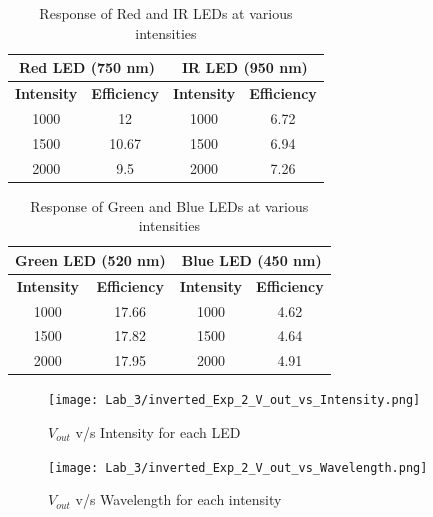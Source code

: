 \documentclass[a4paper]{article}
\begin{document}
\newpage
\begin{table}[h!]
\centering
\begin{tabular}{|c|c|c|c|}
\hline
\multicolumn{2}{|c|}{\textbf{Red LED (750 nm)}} & \multicolumn{2}{c|}{\textbf{IR LED (950 nm)}} \\ \hline
\textbf{Intensity} & \textbf{Efficiency} & \textbf{Intensity} & \textbf{Efficiency} \\ \hline
1000 & 12 & 1000 & 6.72 \\ \hline
1500 & 10.67 & 1500 & 6.94 \\ \hline
2000 & 9.5 & 2000 & 7.26 \\ \hline
\end{tabular}
\caption{Response of Red and IR LEDs at various intensities}
\label{tab:red_ir_led}
\end{table}

\vspace{1em}

\begin{table}[h!]
\centering
\begin{tabular}{|c|c|c|c|}
\hline
\multicolumn{2}{|c|}{\textbf{Green LED (520 nm)}} & \multicolumn{2}{c|}{\textbf{Blue LED (450 nm)}} \\ \hline
\textbf{Intensity} & \textbf{Efficiency} & \textbf{Intensity} & \textbf{Efficiency} \\ \hline
1000 & 17.66 & 1000 & 4.62 \\ \hline
1500 & 17.82 & 1500 & 4.64 \\ \hline
2000 & 17.95 & 2000 & 4.91 \\ \hline
\end{tabular}
\caption{Response of Green and Blue LEDs at various intensities}
\label{tab:green_blue_led}
\end{table}

\begin{figure}[h!]
    \centering
    \texttt{[image: Lab\_3/inverted\_Exp\_2\_V\_out\_vs\_Intensity.png]}
    \caption{$V_{out}$ v/s Intensity for each LED}
    \label{fig:enter-label}
\end{figure}

\newpage

\begin{figure}[h!]
    \centering
    \texttt{[image: Lab\_3/inverted\_Exp\_2\_V\_out\_vs\_Wavelength.png]}
    \caption{$V_{out}$ v/s Wavelength for each intensity}
    \label{fig:enter-label}
\end{figure}


\newpage
\end{document}
